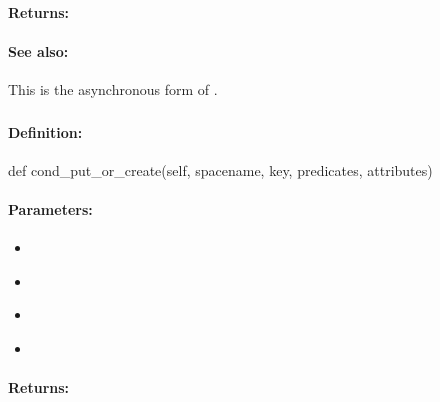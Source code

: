 \paragraph{Returns:}


\paragraph{See also:}  This is the asynchronous form of .

\pagebreak
\subsubsection{}
\label{api:python:cond_put_or_create}


\paragraph{Definition:}
\begin{pythoncode}
def cond_put_or_create(self, spacename, key, predicates, attributes)
\end{pythoncode}

\paragraph{Parameters:}
\begin{itemize}[noitemsep]
\item {}\\

\item {}\\

\item {}\\

\item {}\\

\end{itemize}

\paragraph{Returns:}


